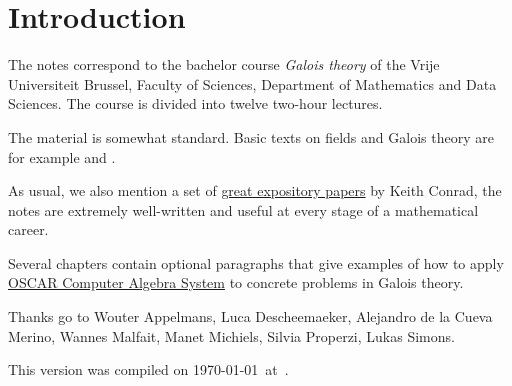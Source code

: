 \section*{Introduction}

The notes correspond to the bachelor 
course \emph{Galois theory} of the 
Vrije Universiteit Brussel, 
Faculty of Sciences, 
Department of Mathematics and Data Sciences. The course
is divided into twelve two-hour lectures. 

The material is somewhat standard. Basic texts on fields and Galois theory 
are for example \cite{MR1645586} and 
\cite{MR3379917}. 

As usual, we also mention a set of 
\href{https://kconrad.math.uconn.edu/blurbs/}{great expository papers} by 
Keith Conrad, the notes are extremely well-written and useful  
at every stage of a mathematical career. 

Several chapters contain optional paragraphs that give examples of 
how to apply \href{https://oscar.computeralgebra.de/}{OSCAR Computer Algebra System}
to concrete problems in Galois theory. 

 
Thanks go to Wouter Appelmans, Luca Descheemaeker, 
Alejandro de la Cueva Merino, 
Wannes Malfait, Manet Michiels, Silvia Properzi, 
Lukas Simons. 


This version 
was compiled on \today~at~\currenttime.
